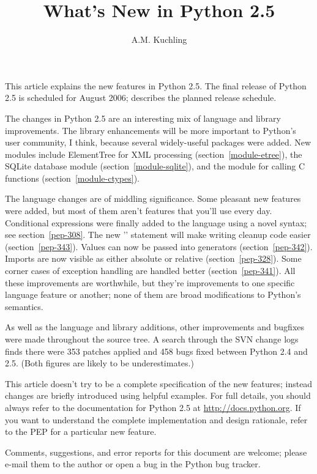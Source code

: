 \documentclass{howto}
\title{What's New in Python 2.5}
\author{A.M. Kuchling}
\begin{document}
\maketitle
\tableofcontents

This article explains the new features in Python 2.5.  The final
release of Python 2.5 is scheduled for August 2006;
 describes the planned release schedule.

The changes in Python 2.5 are an interesting mix of language and
library improvements. The library enhancements will be more important
to Python's user community, I think, because several widely-useful
packages were added.  New modules include ElementTree for XML
processing (section~\ref{module-etree}), the SQLite database module
(section~\ref{module-sqlite}), and the  module for
calling C functions (section~\ref{module-ctypes}).

The language changes are of middling significance.  Some pleasant new
features were added, but most of them aren't features that you'll use
every day.  Conditional expressions were finally added to the language
using a novel syntax; see section~\ref{pep-308}.  The new
'' statement will make writing cleanup code easier
(section~\ref{pep-343}).  Values can now be passed into generators
(section~\ref{pep-342}).  Imports are now visible as either absolute
or relative (section~\ref{pep-328}).  Some corner cases of exception
handling are handled better (section~\ref{pep-341}).  All these
improvements are worthwhile, but they're improvements to one specific
language feature or another; none of them are broad modifications to
Python's semantics.

As well as the language and library additions, other improvements and
bugfixes were made throughout the source tree.  A search through the
SVN change logs finds there were 353 patches applied and 458 bugs
fixed between Python 2.4 and 2.5.  (Both figures are likely to be
underestimates.)  

This article doesn't try to be a complete specification of the new
features; instead changes are briefly introduced using helpful
examples.  For full details, you should always refer to the
documentation for Python 2.5 at \url{http://docs.python.org}.
If you want to understand the complete implementation and design
rationale, refer to the PEP for a particular new feature.

Comments, suggestions, and error reports for this document are
welcome; please e-mail them to the author or open a bug in the Python
bug tracker.
\end{document}
